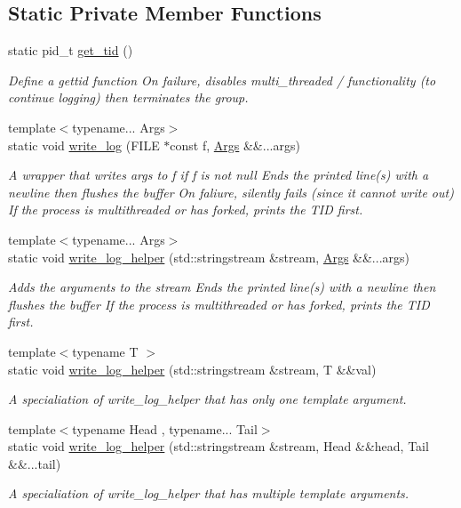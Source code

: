 \subsection*{Static Private Member Functions}
\begin{DoxyCompactItemize}
\item 
static pid\+\_\+t \hyperlink{class_utilities_a93f3699cf92128c66efa084ff1399a45}{get\+\_\+tid} ()
\begin{DoxyCompactList}\small\item\em Define a gettid function On failure, disables multi\+\_\+threaded / functionality (to continue logging) then terminates the group. \end{DoxyCompactList}\item 
{\footnotesize template$<$typename... Args$>$ }\\static void \hyperlink{class_utilities_a7085b246ac1d31d8d3ac16663e6718d9}{write\+\_\+log} (F\+I\+LE $\ast$const f, \hyperlink{struct_args}{Args} \&\&...args)
\begin{DoxyCompactList}\small\item\em A wrapper that writes args to f if f is not null Ends the printed line(s) with a newline then flushes the buffer On faliure, silently fails (since it cannot write out) If the process is multithreaded or has forked, prints the T\+ID first. \end{DoxyCompactList}\item 
{\footnotesize template$<$typename... Args$>$ }\\static void \hyperlink{class_utilities_a0763f59c16f6eb83b9c0e8abe014287a}{write\+\_\+log\+\_\+helper} (std\+::stringstream \&stream, \hyperlink{struct_args}{Args} \&\&...args)
\begin{DoxyCompactList}\small\item\em Adds the arguments to the stream Ends the printed line(s) with a newline then flushes the buffer If the process is multithreaded or has forked, prints the T\+ID first. \end{DoxyCompactList}\item 
{\footnotesize template$<$typename T $>$ }\\static void \hyperlink{class_utilities_ae816a2f7a656a433f6204687bff59a6c}{write\+\_\+log\+\_\+helper} (std\+::stringstream \&stream, T \&\&val)
\begin{DoxyCompactList}\small\item\em A specialiation of write\+\_\+log\+\_\+helper that has only one template argument. \end{DoxyCompactList}\item 
{\footnotesize template$<$typename Head , typename... Tail$>$ }\\static void \hyperlink{class_utilities_a6b7a8d8b77768fde23f66d4f7a57c1c6}{write\+\_\+log\+\_\+helper} (std\+::stringstream \&stream, Head \&\&head, Tail \&\&...tail)
\begin{DoxyCompactList}\small\item\em A specialiation of write\+\_\+log\+\_\+helper that has multiple template arguments. \end{DoxyCompactList}\end{DoxyCompactItemize}
